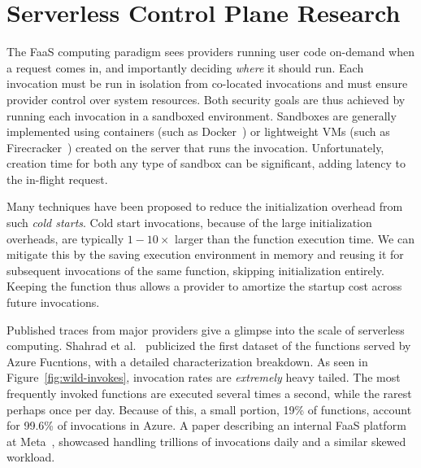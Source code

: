 \section{Serverless Control Plane Research}
\label{sec:platform-enhance}

The FaaS computing paradigm sees providers running user code on-demand when a request comes in, and importantly deciding \emph{where} it should run. 
Each invocation must be run in isolation from co-located invocations and must ensure provider control over system resources.
Both security goals are thus achieved by running each invocation in a sandboxed environment. 
Sandboxes are generally implemented using containers (such as Docker~\cite{docker-main}) or lightweight VMs (such as Firecracker~\cite{firecracker-nsdi20}) created on the server that runs the invocation.
Unfortunately, creation time for both any type of sandbox can be significant, adding latency to the in-flight request. 

Many techniques have been proposed to reduce the initialization overhead from such \emph{cold starts}.
Cold start invocations, because of the large initialization overheads, are typically $1-10\times$ larger than the function execution time.
We can mitigate this by the saving execution environment in memory and reusing it for subsequent invocations of the same function, skipping initialization entirely. 
Keeping the function  thus allows a provider to amortize the startup cost across future invocations.

Published traces from major providers give a glimpse into the scale of serverless computing.
Shahrad et al.~\cite{shahrad_serverless_2020} publicized the first dataset of the functions served by Azure Fucntions, with a detailed characterization breakdown.
As seen in Figure~\ref{fig:wild-invokes}, invocation rates are \emph{extremely} heavy tailed.
The most frequently invoked functions are executed several times a second, while the rarest perhaps once per day.
Because of this, a small portion, 19\% of functions, account for 99.6\% of invocations in Azure.
A paper describing an internal FaaS platform at Meta~\cite{sahraei2023xfaas}, showcased handling trillions of invocations daily and a similar skewed workload.

